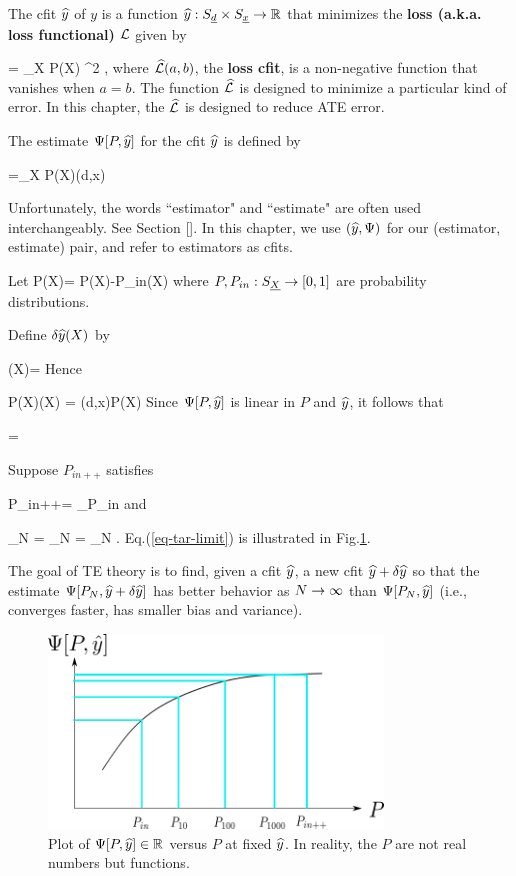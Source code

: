 The cfit ${\widehat{y}}$ of $y$
is a function ${\widehat{y}}:S_{\underline{d}}\times S_{\underline{x}}\rightarrow { \mathbb{R}}$
that minimizes the {\bf loss (a.k.a. loss functional)} ${\cal L}$
given by


\beq
\call[P, \haty]= \sum_X P(X) \hatl[y, \haty(d,x)]^2
\;,
\eeq
where $\widehat{{\cal L}}(a,b)$, the {\bf loss
cfit}, is a
non-negative function
that vanishes when $a=b$.
The function $\widehat{{\cal L}}$ is designed
to minimize a particular kind of error.
In this chapter, the $\widehat{{\cal L}}$
is designed to reduce ATE error.


The estimate
 $\Psi[P, {\widehat{y}}]$ for the cfit ${\widehat{y}}$
is defined by

\beq
\Psi[P, \haty] =\sum_X P(X)\haty(d,x)
\eeq

Unfortunately, the words ``estimator"
and ``estimate" are often used
interchangeably. See Section
[].
In this chapter, we use $({\widehat{y}}, \Psi)$
for our (estimator, estimate) pair,
and refer to estimators as cfits.


Let
\beq
\delta P(X)=
P(X)-P_{in}(X)
\eeq
where $P, P_{in}:S_{\underline{X}}\rightarrow [0,1]$ are
probability distributions.

Define $\delta{\widehat{y}}(X)$ by

\beq
\delta\haty(X)= 
\eeq
Hence

\beq
P(X)\delta\haty(X) = \haty(d,x)\delta P(X)
\eeq
Since $\Psi[P, {\widehat{y}}]$
is linear in $P$ and ${\widehat{y}}$,
it follows that

\beq
{}=
\eeq


Suppose $P_{in++}$ satisfies


\beq
P_{in++}= \argmin_{P_{in}}\call[P_{in}, \haty]
\eeq
and

\beq
\lim_{N\rarrow \infty}
=
\lim_{N\rarrow \infty}
=
\lim_{N\rarrow \infty}
\Psi[P_N, \haty]
\label{eq-tar-limit}
\;.
\eeq
Eq.(\ref{eq-tar-limit}) is illustrated in
Fig.\ref{fig-targeted-p-psi-plot.png}.

The goal of TE theory
is to find, given a cfit ${\widehat{y}}$,
a new cfit ${\widehat{y}} +\delta {\widehat{y}}$
so that the
estimate $\Psi[P_N, {\widehat{y}}+\delta {\widehat{y}}]$
has better behavior as $N\rightarrow \infty$ than
$\Psi[P_N, {\widehat{y}}]$ (i.e., converges faster,
has smaller bias and variance).


\begin{figure}[h!]
\centering
\includegraphics[width=3.5in]
{targeted-est/targeted-p-psi-plot.png}
\caption{
Plot of $\Psi[P, {\widehat{y}}]\in { \mathbb{R}}$ versus $P$
at fixed ${\widehat{y}}$.
In reality, the $P$ are not real numbers but
functions.
}
\label{fig-targeted-p-psi-plot.png}
\end{figure}


